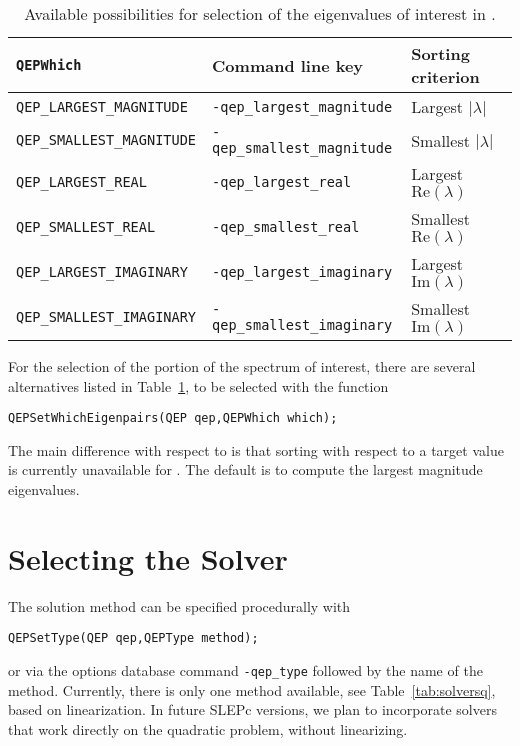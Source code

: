 \begin{table}
\centering
{\small \begin{tabular}{lll}
\texttt{QEPWhich}                  & Command line key                   & Sorting criterion \\\hline
\texttt{QEP\_LARGEST\_MAGNITUDE}   & \texttt{-qep\_largest\_magnitude}  & Largest $|\lambda|$ \\
\texttt{QEP\_SMALLEST\_MAGNITUDE}  & \texttt{-qep\_smallest\_magnitude} & Smallest $|\lambda|$ \\
\texttt{QEP\_LARGEST\_REAL}        & \texttt{-qep\_largest\_real}       & Largest $\mathrm{Re}(\lambda)$ \\
\texttt{QEP\_SMALLEST\_REAL}       & \texttt{-qep\_smallest\_real}      & Smallest $\mathrm{Re}(\lambda)$ \\
\texttt{QEP\_LARGEST\_IMAGINARY}   & \texttt{-qep\_largest\_imaginary}  & Largest $\mathrm{Im}(\lambda)$\footnotemark \\
\texttt{QEP\_SMALLEST\_IMAGINARY}  & \texttt{-qep\_smallest\_imaginary} & Smallest $\mathrm{Im}(\lambda)$\addtocounter{footnote}{-1}\footnotemark \\\hline
\end{tabular} }
\caption{\label{tab:portionq}Available possibilities for selection of the eigenvalues of interest in .}
\end{table}


	For the selection of the portion of the spectrum of interest, there are several alternatives listed in Table~\ref{tab:portionq}, to be selected with the function
	\begin{Verbatim}[fontsize=\small]
	QEPSetWhichEigenpairs(QEP qep,QEPWhich which);
	\end{Verbatim}
The main difference with respect to  is that sorting with respect to a target value is currently unavailable for . The default is to compute the largest magnitude eigenvalues.


\section{Selecting the Solver}

The solution method can be specified procedurally with
	\begin{Verbatim}[fontsize=\small]
	QEPSetType(QEP qep,QEPType method);
	\end{Verbatim}
or via the options database command \Verb!-qep_type! followed by the name of the method. Currently, there is only one method available, see Table~\ref{tab:solversq}, based on linearization. In future SLEPc versions, we plan to incorporate solvers that work directly on the quadratic problem, without linearizing.

